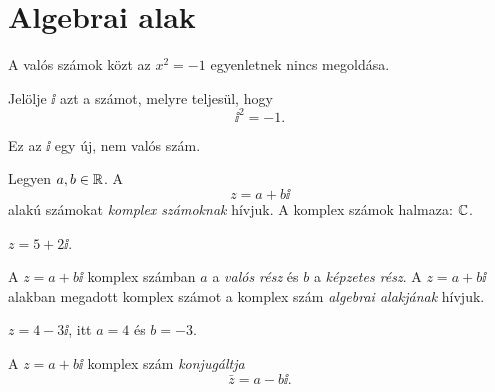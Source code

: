 \documentclass[11pt]{article}
\begin{document}

\section{Algebrai alak}

A valós számok közt az $x^{2}=-1$ egyenletnek nincs megoldása.

\begin{defbox}
\begin{definition}
Jelölje $\ii$ azt a számot, melyre teljesül, hogy
\[
\ii^{2}=-1 .
\]
\end{definition}
\end{defbox}
Ez az $\ii$ egy új, nem valós szám.

\begin{defbox}
\begin{definition}
Legyen $a, b\in\mathbb{R}$. A
\[
z=a+b\ii
\]
alakú számokat \emph{komplex számoknak} hívjuk. A komplex számok halmaza: $\mathbb{C}$.
\end{definition}
\end{defbox}

\begin{exbox}
\begin{example}
$z=5+2\ii$.
\end{example}
\end{exbox}

\begin{defbox}
\begin{definition}
A $z=a+b\ii$ komplex számban $a$ a \emph{valós rész} és $b$ a \emph{képzetes rész}. A $z=a+b\ii$ alakban megadott komplex számot a komplex szám \emph{algebrai alakjának} hívjuk.
\end{definition}
\end{defbox}

\begin{exbox}
\begin{example}
$z=4-3\ii$, itt $a=4$ és $b=-3$.
\end{example}
\end{exbox}

\begin{defbox}
\begin{definition}[Konjugált]
A $z=a+b\ii$ komplex szám \emph{konjugáltja}
\[
\bar z=a-b\ii .
\]
\end{definition}
\end{defbox}
\end{document}
